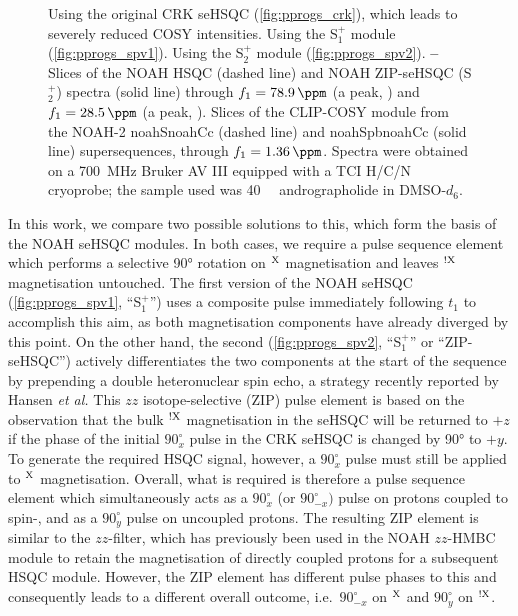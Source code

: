 \documentclass[11pt]{article}
\newcommand*{\noahtwo}[2]{\csname noah#1\endcsname\csname noah#2\endcsname}
\newcommand*{\noahSpa}{S$^+_1$}
\newcommand*{\noahSpb}{S$^+_2$}
\newcommand*{\proton}{\ce{^{1}H}}
\newcommand*{\magn}[1]{\ce{^1H}$^{#1}$}
\newcommand*{\magnnot}[1]{\ce{^1H}$^{!#1}$}
\newcommand*{\andro}{Spectra were obtained on a \SI{700}{\MHz} Bruker AV III equipped with a TCI H/C/N cryoprobe; the sample used was \SI{40}{\milli\molar} andrographolide in DMSO-$d_6$.}
\begin{document}
\begin{refsection}
\begin{figure}
{        \textbf{} Using the original CRK seHSQC (\cref{fig:pprogs_crk}), which leads to severely reduced COSY intensities.
        \textbf{} Using the \noahSpa{} module (\cref{fig:pprogs_spv1}).
        \textbf{} Using the \noahSpb{} module (\cref{fig:pprogs_spv2}).
        \textbf{--} Slices of the NOAH HSQC (dashed line) and NOAH ZIP-seHSQC (\noahSpb{}) spectra (solid line) through $f_1 = \SI{78.9}{\ppm}$ (a  peak, ) and $f_1 = \SI{28.5}{\ppm}$ (a  peak, ).
        \textbf{} Slices of the CLIP-COSY module from the NOAH-2 \noahtwo{S}{Cc} (dashed line) and \noahtwo{Spb}{Cc} (solid line) supersequences, through $f_1 = \SI{1.36}{\ppm}$.
        \andro{}
    }
    \label{fig:sehsqc_comp}
\end{figure}

In this work, we compare two possible solutions to this, which form the basis of the NOAH seHSQC modules.
In both cases, we require a pulse sequence element which performs a selective \ang{90} rotation on \magn{\ce{X}} magnetisation and leaves \magnnot{\ce{X}} magnetisation untouched.
The first version of the NOAH seHSQC (\cref{fig:pprogs_spv1}, ``\noahSpa'') uses a composite \proton{} pulse immediately following $t_1$ to accomplish this aim, as both magnetisation components have already diverged by this point.
On the other hand, the second (\cref{fig:pprogs_spv2}, ``\noahSpa'' or ``ZIP-seHSQC'') actively differentiates the two components at the start of the sequence by prepending a double heteronuclear spin echo, a strategy recently reported by Hansen \textit{et al.}\autocite{Hansen2021}
This $zz$ isotope-selective (ZIP) pulse element is based on the observation that the bulk \magnnot{\ce{X}} magnetisation in the seHSQC will be returned to $+z$ if the phase of the initial \proton{} $90^\circ_{x}$ pulse in the CRK seHSQC is changed by \ang{90} to $+y$.
To generate the required HSQC signal, however, a \proton{} $90^\circ_x$ pulse must still be applied to \magn{\ce{X}} magnetisation.
Overall, what is required is therefore a pulse sequence element which simultaneously acts as a $90^\circ_x$ (or $90^\circ_{-x})$ pulse on protons coupled to spin-, and as a $90^\circ_y$ pulse on uncoupled protons.
The resulting ZIP element is similar to the $zz$-filter, which has previously been used in the NOAH $zz$-HMBC module to retain the magnetisation of directly coupled protons for a subsequent HSQC module.\autocite{Kupce2018CC, Kupce2019JMR}
However, the ZIP element has different pulse phases to this and consequently leads to a different overall outcome, i.e.\ $90^\circ_{-x}$ on \magn{\ce{X}} and $90^\circ_y$ on \magnnot{\ce{X}}.


\end{refsection}
\end{document}
